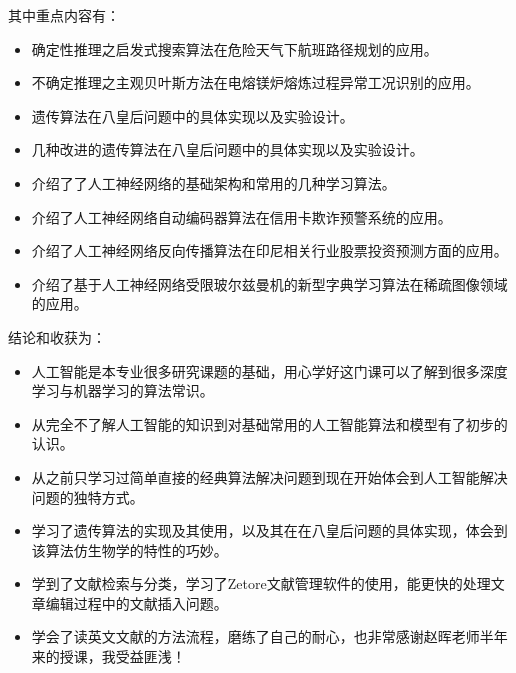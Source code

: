 \documentclass[12pt,a4paper,UTF8]{ctexart}
\begin{document}
其中重点内容有：
\begin{itemize}
    \item 确定性推理之启发式搜索算法在危险天气下航班路径规划的应用。
    \item 不确定推理之主观贝叶斯方法在电熔镁炉熔炼过程异常工况识别的应用。
    \item 遗传算法在八皇后问题中的具体实现以及实验设计。
    \item 几种改进的遗传算法在八皇后问题中的具体实现以及实验设计。
    \item 介绍了了人工神经网络的基础架构和常用的几种学习算法。
    \item 介绍了人工神经网络自动编码器算法在信用卡欺诈预警系统的应用。
    \item 介绍了人工神经网络反向传播算法在印尼相关行业股票投资预测方面的应用。
    \item 介绍了基于人工神经网络受限玻尔兹曼机的新型字典学习算法在稀疏图像领域的应用。
\end{itemize}
结论和收获为：
\begin{itemize}
    \item 人工智能是本专业很多研究课题的基础，用心学好这门课可以了解到很多深度学习与机器学习的算法常识。
    \item 从完全不了解人工智能的知识到对基础常用的人工智能算法和模型有了初步的认识。
    \item 从之前只学习过简单直接的经典算法解决问题到现在开始体会到人工智能解决问题的独特方式。
    \item 学习了遗传算法的实现及其使用，以及其在在八皇后问题的具体实现，体会到该算法仿生物学的特性的巧妙。
    \item 学到了文献检索与分类，学习了Zetore文献管理软件的使用，能更快的处理文章编辑过程中的文献插入问题。
    \item 学会了读英文文献的方法流程，磨练了自己的耐心，也非常感谢赵晖老师半年来的授课，我受益匪浅！
\end{itemize}



\end{document}
